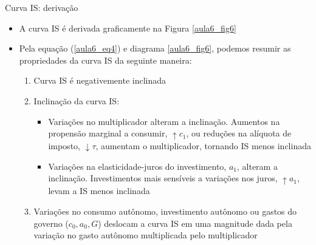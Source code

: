 \documentclass[10pt]{beamer}
\begin{document}
\begin{frame}{Curva IS: derivação}
    \begin{itemize}
        \item A curva IS é derivada graficamente na Figura \ref{aula6_fig6}\bigskip

        \item Pela equação (\ref{aula6_eq4}) e diagrama \ref{aula6_fig6}, podemos resumir as propriedades da curva IS da seguinte maneira:\bigskip

        \begin{enumerate}
            \item Curva IS é negativemente inclinada\medskip

            \item Inclinação da curva IS:\medskip

            \begin{itemize}
                \item Variações no multiplicador alteram a inclinação. Aumentos na propensão marginal a consumir, $\uparrow c_1$, ou reduções na alíquota de imposto, $\downarrow \tau$, aumentam o multiplicador, tornando IS menos inclinada\medskip

                \item Variações na elasticidade-juros do investimento, $a_1$, alteram a inclinação. Investimentos mais sensíveis a variações nos juros, $\uparrow a_1$, levam a IS menos inclinada
            \end{itemize}
            \item Variações no consumo autônomo, investimento autônomo ou gastos do governo ($c_0, a_0, G$) deslocam a curva IS em uma magnitude dada pela variação no gasto autônomo multiplicada pelo multiplicador
        \end{enumerate}
    \end{itemize}
\end{frame}
\end{document}
